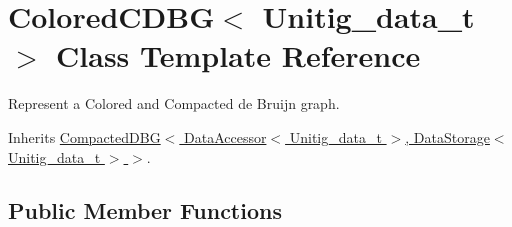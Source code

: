 \hypertarget{classColoredCDBG}{}\section{Colored\+C\+D\+BG$<$ Unitig\+\_\+data\+\_\+t $>$ Class Template Reference}
\label{classColoredCDBG}


Represent a Colored and Compacted de Bruijn graph.  




Inherits \hyperlink{classCompactedDBG}{Compacted\+D\+B\+G$<$ Data\+Accessor$<$ Unitig\+\_\+data\+\_\+t $>$, Data\+Storage$<$ Unitig\+\_\+data\+\_\+t $>$ $>$}.

\subsection*{Public Member Functions}
